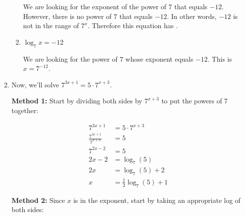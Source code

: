 \documentclass{article}
\begin{document}
\begin{enumerate}[resume]
\begin{enumerate}
    \begin{solution}
      We are looking for the exponent of the power of $7$ that equals
      $-12$. However, there is no power of $7$ that equals $-12$. 
      In other words, $-12$ is not
      in the range of $7^x$. Therefore this equation has
      .
    \end{solution}

  \item
    \begin{problem}[\nstretch{0.2}]
      $\log_7 x = -12$
    \end{problem}

    \begin{solution}
      We are looking for the power of $7$ whose exponent equals $-12$.
      This is $x=\boxed{7^{-12}}$.
    \end{solution}

  \end{enumerate}

\item 


  \begin{problem}
    Now, we'll solve $7^{3x + 1} = 5 \cdot 7^{x + 3}$.
  \end{problem}

  {
    \setlength{\columnseprule}{0.4pt}
    \begin{multicols}{2}
      \textbf{Method 1:} Start by dividing both sides by $7^{x + 3}$ to put the powers of 7 together:

      \begin{solution}
        \begin{align*}
          7^{3x + 1} &= 5 \cdot 7^{x + 3} \\
          \frac{7^{3x+1}}{7^{x+3}} &= 5 \\
          7^{2x-2} &= 5 \\
          2x -2 &= \log_{7}(5) \\
          2x &= \log_7(5)+2 \\
          x &= \boxed{\tfrac{1}{2}\log_7(5) + 1}
        \end{align*}
      \end{solution}

      \pspacestar{2.5in}

      \columnbreak

      \textbf{Method 2:} Since $x$ is in the exponent, start by taking an appropriate log of both sides:


\end{multicols}}
\end{enumerate}
\end{document}
